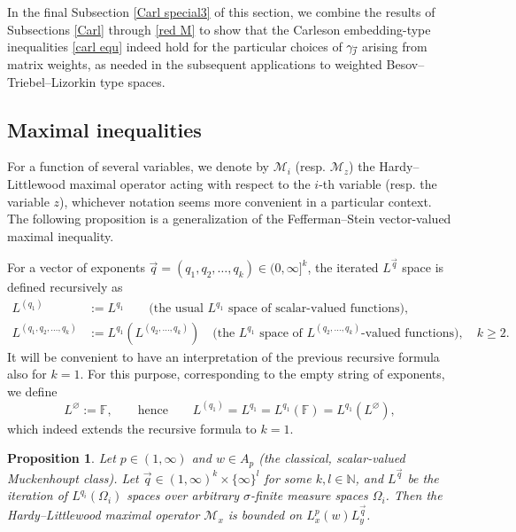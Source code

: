 \documentclass[11pt, reqno]{amsart}
\newtheorem{proposition}[theorem]{Proposition}
\theoremstyle{definition}
\theoremstyle{remark}
\numberwithin{equation}{section}
\newcommand{\F}{\mathbb F}
\newcommand{\N}{\mathbb N}
\newcommand{\vj}{\vec{\textit{\j}}}
\newcommand{\vq}{\vec q}
\begin{document}
In the final Subsection \ref{Carl special3} of this section, we combine the results of Subsections \ref{Carl} through \ref{red M} to show that the Carleson embedding-type inequalities \eqref{carl equ} indeed hold for the particular choices of $\gamma_{\vj}$ arising from matrix weights, as needed in the subsequent applications to weighted Besov--Triebel--Lizorkin type spaces.

\subsection{Maximal inequalities}\label{sec:FS}

For a function of several variables, we denote by $\mathcal M_i$ (resp. $\mathcal M_z$) the Hardy--Littlewood maximal operator acting with respect to the $i$-th variable (resp. the variable $z$),
whichever notation seems more convenient in a particular context.
The following proposition is a generalization of
the Fefferman--Stein vector-valued maximal inequality.

For a vector of exponents $\vq=(q_1,q_2,\ldots,q_k)\in(0,\infty]^k$,
the iterated $L^{\vq}$ space is defined recursively as
\begin{equation*}
\begin{split}
  L^{(q_1)} &:=L^{q_1}\qquad\text{(the usual $L^{q_1}$ space of scalar-valued functions)},\\
  L^{(q_1,q_2,\ldots,q_k)} &:=L^{q_1}(L^{(q_2,\ldots,q_k)})
  \quad\text{(the $L^{q_1}$ space of $L^{(q_2,\ldots,q_k)}$-valued functions)},\quad k\geq 2.
\end{split}
\end{equation*}
It will be convenient to have an interpretation of the previous recursive formula also for $k=1$. For this purpose, corresponding to the empty string of exponents, we define
\begin{equation*}
  L^{\varnothing}:=\F,\qquad
 \text{hence}\qquad
  L^{(q_1)}=L^{q_1}=L^{q_1}(\F)=L^{q_1}(L^{\varnothing}),
\end{equation*}
which indeed extends the recursive formula to $k=1$.

\begin{proposition}\label{MonLpw}
Let $p\in(1,\infty)$ and $w\in A_p$
(the classical, scalar-valued Muckenhoupt class).
Let $\vq\in(1,\infty)^k\times\{\infty\}^l$ for some $k,l\in\N$,
and $L^{\vq}$ be the iteration of $L^{q_i}(\Omega_i)$ spaces
over arbitrary $\sigma$-finite measure spaces $\Omega_i$.
Then the Hardy--Little\-wood maximal operator $\mathcal M_x$ is bounded on $L^p_x(w)L^{\vq}_y$.
\end{proposition}
\end{document}
